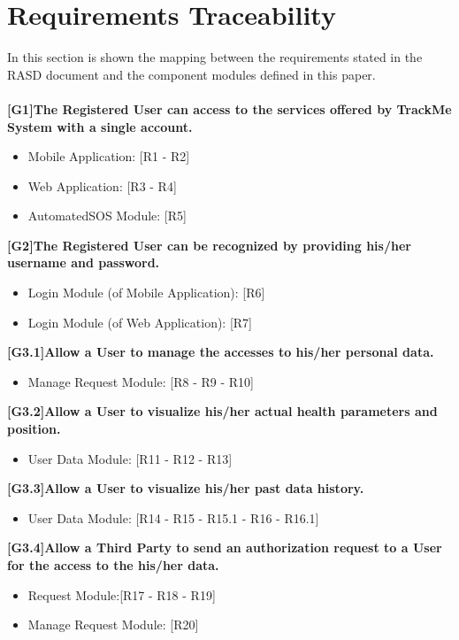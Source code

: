 \chapter{Requirements Traceability}
 In this section is shown the mapping between the requirements stated in the RASD document and the component modules defined in this paper.
\\ \\
\textbf{[G1]The Registered User can access to the services offered by TrackMe System with a single account.}
\begin{itemize}
	\item Mobile Application: [R1 - R2]
	\item Web Application: [R3 - R4]
	\item AutomatedSOS Module: [R5]
\end{itemize} 

\textbf{[G2]The Registered User can be recognized by providing his/her username and password.}
\begin{itemize}
	\item Login Module (of Mobile Application): [R6] 
	\item Login Module (of Web Application): [R7]
\end{itemize} 

\textbf{[G3.1]Allow a User to manage the accesses to his/her personal data.}
\begin{itemize}
	\item Manage Request Module: [R8 - R9 - R10]
\end{itemize}

\textbf{[G3.2]Allow a User to visualize his/her actual health parameters and position.}
\begin{itemize}
	\item User Data Module: [R11 - R12 - R13]
\end{itemize} 

\textbf{[G3.3]Allow a User to visualize his/her past data history.}
\begin{itemize}
	\item User Data Module: [R14 - R15 - R15.1 - R16 - R16.1]
\end{itemize}

\textbf{[G3.4]Allow a Third Party to send an authorization request to a User for the access to the his/her data.}
\begin{itemize}
	\item Request Module:[R17 - R18 - R19]
	\item  Manage Request Module: [R20]
\end{itemize}


